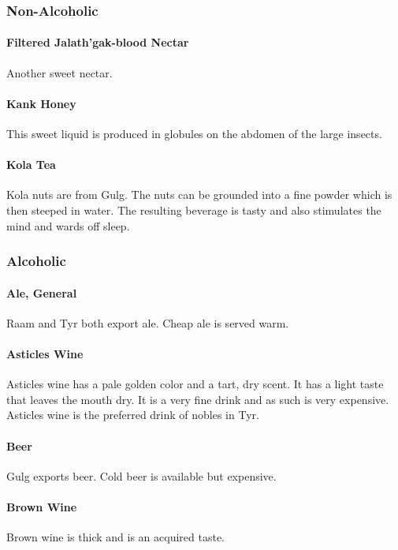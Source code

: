 \begin{multicols}{2}

\subsubsection{Non-Alcoholic}

\paragraph{Filtered Jalath’gak-blood Nectar} Another sweet nectar.\\
\paragraph{Kank Honey} This sweet liquid is produced in globules on the abdomen of the large insects.\\
\paragraph{Kola Tea} Kola nuts are from Gulg. The nuts can be grounded into a fine powder which is then steeped in water. The resulting beverage is tasty and also stimulates the mind and wards off sleep.\\

\subsubsection{Alcoholic}
\paragraph{Ale, General} Raam and Tyr both export ale. Cheap ale is served warm.\\
\paragraph{Asticles Wine} Asticles wine has a pale golden color and a tart, dry scent. It has a light taste that leaves the mouth dry. It is a very fine drink and as such is very expensive. Asticles wine is the preferred drink of nobles in Tyr.\\
\paragraph{Beer} Gulg exports beer. Cold beer is available but expensive.\\
\paragraph{Brown Wine} Brown wine is thick and is an acquired taste.\\

\end{multicols}
